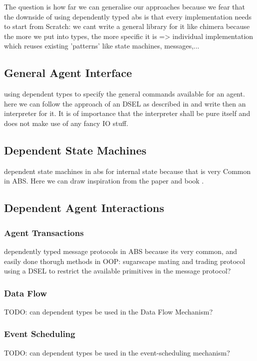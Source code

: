 The question is how far we can generalise our approaches because we fear that the downside of using dependently typed abs is that every implementation needs to start from Scratch: we cant write a general library for it like chimera because the more we put into types, the more specific it is => individual implementation which reuses existing 'patterns' like state machines, messages,...

\subsection{General Agent Interface}
using dependent types to specify the general commands available for an agent. here we can follow the approach of an DSEL as described in \cite{brady_correct-by-construction_2010} and write then an interpreter for it. It is of importance that the interpreter shall be pure itself and does not make use of any fancy IO stuff.

\subsection{Dependent State Machines}
dependent state machines in abs for internal state because that is very Common in ABS. Here we can draw inspiration from the paper \cite{brady_state_2016} and book \cite{brady_type-driven_2017}.

\subsection{Dependent Agent Interactions}
\subsubsection{Agent Transactions}
dependently typed message protocols in ABS because its very common, and easily done thorugh methods in OOP: sugarscape mating and trading protocol
using a DSEL \cite{brady_correct-by-construction_2010} to restrict the available primitives in the message protocol?

\subsubsection{Data Flow}
TODO: can dependent types be used in the Data Flow Mechanism?
\subsubsection{Event Scheduling}
TODO: can dependent types be used in the event-scheduling mechanism?

